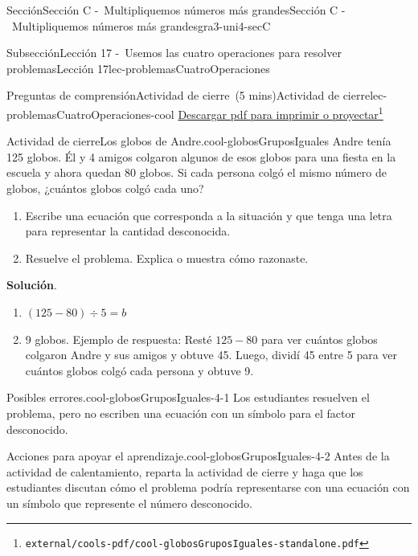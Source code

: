 \documentclass[oneside,10pt,]{article}
\newcommand{\blocktitlefont}{\relax}
\begin{document}
\begin{sectionptx}{Sección}{Sección C -~Multipliquemos números más grandes}{}{Sección C -~Multipliquemos números más grandes}{}{}{gra3-uni4-secC}
\begin{subsectionptx}{Subsección}{Lección 17 -~Usemos las cuatro operaciones para resolver problemas}{}{Lección 17}{}{}{lec-problemasCuatroOperaciones}
\begin{reading-questions-subsubsection}{Preguntas de comprensión}{Actividad de cierre~(5 mins)}{}{Actividad de cierre}{}{}{lec-problemasCuatroOperaciones-cool}
\href{external/cools-pdf/cool-globosGruposIguales-standalone.pdf}{Descargar pdf para imprimir o proyectar}\footnote{\nolinkurl{external/cools-pdf/cool-globosGruposIguales-standalone.pdf}\label{lec-problemasCuatroOperaciones-cool-5}}\begin{project}{Actividad de cierre}{Los globos de Andre.}{cool-globosGruposIguales}%
Andre tenía 125 globos. Él y 4 amigos colgaron algunos de esos globos para una fiesta en la escuela y ahora quedan 80 globos. Si cada persona colgó el mismo número de globos, ¿cuántos globos colgó cada uno?%
%
\begin{enumerate}[label={(\alph*)}]
\item{}Escribe una ecuación que corresponda a la situación y que tenga una letra para representar la cantidad desconocida.%
\item{}Resuelve el problema. Explica o muestra cómo razonaste.%
\end{enumerate}
\par\smallskip%
\noindent\textbf{\blocktitlefont Solución}.\hypertarget{cool-globosGruposIguales-3}{}\quad{}%
\begin{enumerate}[label={(\alph*)}]
\item{}\(\displaystyle (125-80) \div 5 = {b}\)%
\item{}9 globos. Ejemplo de respuesta: Resté \(125-80\) para ver cuántos globos colgaron Andre y sus amigos y obtuve 45. Luego, dividí 45 entre 5 para ver cuántos globos colgó cada persona y obtuve 9.%
\end{enumerate}
\end{project}%
\par
\begin{paragraphs}{Posibles errores.}{cool-globosGruposIguales-4-1}%
Los estudiantes resuelven el problema, pero no escriben una ecuación con un símbolo para el factor desconocido.%
\end{paragraphs}%
\begin{paragraphs}{Acciones para apoyar el aprendizaje.}{cool-globosGruposIguales-4-2}%
Antes de la actividad de calentamiento, reparta la actividad de cierre y haga que los estudiantes discutan cómo el problema podría representarse con una ecuación con un símbolo que represente el número desconocido.%
\end{paragraphs}%
\end{reading-questions-subsubsection}
\end{subsectionptx}
%
%
\typeout{************************************************}

\end{sectionptx}
\end{document}
